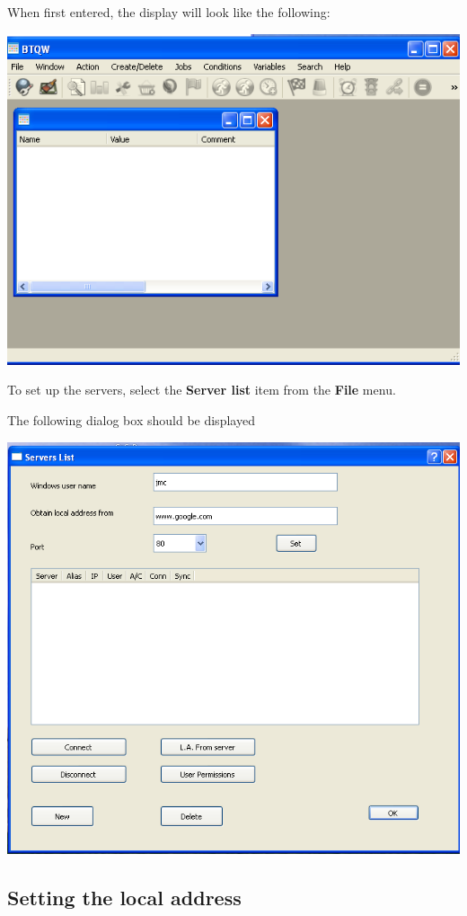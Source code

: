 When first entered, the display will look like the following:

\includegraphics{img/btqwinit.png}

To set up the servers, select the \textbf{Server list} item from the \textbf{File} menu.

The following dialog box should be displayed

\includegraphics{img/btqwservinit.png}

\subsection{Setting the local address}

